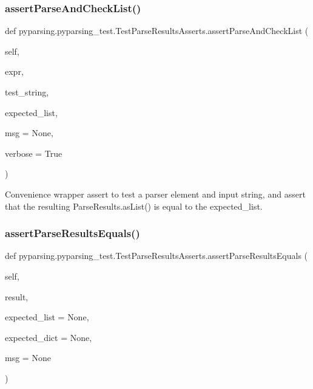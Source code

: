 \subsubsection{\texorpdfstring{assert\+Parse\+And\+Check\+List()}{assertParseAndCheckList()}}
{\footnotesize\ttfamily def pyparsing.\+pyparsing\+\_\+test.\+Test\+Parse\+Results\+Asserts.\+assert\+Parse\+And\+Check\+List (\begin{DoxyParamCaption}\item[{}]{self,  }\item[{}]{expr,  }\item[{}]{test\+\_\+string,  }\item[{}]{expected\+\_\+list,  }\item[{}]{msg = {\ttfamily None},  }\item[{}]{verbose = {\ttfamily True} }\end{DoxyParamCaption})}

\begin{DoxyVerb}Convenience wrapper assert to test a parser element and input string, and assert that
the resulting ParseResults.asList() is equal to the expected_list.
\end{DoxyVerb}
 \mbox{\label{classpyparsing_1_1pyparsing__test_1_1TestParseResultsAsserts_a1560d074926037c6140d8270a46ede90}} 
\subsubsection{\texorpdfstring{assert\+Parse\+Results\+Equals()}{assertParseResultsEquals()}}
{\footnotesize\ttfamily def pyparsing.\+pyparsing\+\_\+test.\+Test\+Parse\+Results\+Asserts.\+assert\+Parse\+Results\+Equals (\begin{DoxyParamCaption}\item[{}]{self,  }\item[{}]{result,  }\item[{}]{expected\+\_\+list = {\ttfamily None},  }\item[{}]{expected\+\_\+dict = {\ttfamily None},  }\item[{}]{msg = {\ttfamily None} }\end{DoxyParamCaption})}

